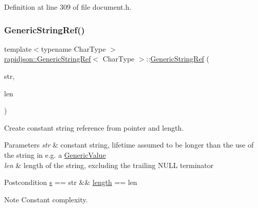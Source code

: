 Definition at line 309 of file document.\+h.


\begin{DoxyCode}{0}

\end{DoxyCode}
\mbox{\label{structrapidjson_1_1_generic_string_ref_ad9eb120a58cee500ff3bd5706779c4e4}} 
\subsubsection{\texorpdfstring{GenericStringRef()}{GenericStringRef()}\hspace{0.1cm}{\footnotesize\ttfamily [3/5]}}
{\footnotesize\ttfamily template$<$typename Char\+Type $>$ \\
\mbox{\hyperlink{structrapidjson_1_1_generic_string_ref}{rapidjson\+::\+Generic\+String\+Ref}}$<$ Char\+Type $>$\+::\mbox{\hyperlink{structrapidjson_1_1_generic_string_ref}{Generic\+String\+Ref}} (\begin{DoxyParamCaption}\item[{const Char\+Type $\ast$}]{str,  }\item[{\mbox{\hyperlink{namespacerapidjson_a44eb33eaa523e36d466b1ced64b85c84}{Size\+Type}}}]{len }\end{DoxyParamCaption})}



Create constant string reference from pointer and length. 


\begin{DoxyParams}{Parameters}
{\em str} & constant string, lifetime assumed to be longer than the use of the string in e.\+g. a \mbox{\hyperlink{classrapidjson_1_1_generic_value}{Generic\+Value}} \\
\hline
{\em len} & length of the string, excluding the trailing N\+U\+LL terminator\\
\hline
\end{DoxyParams}
\begin{DoxyPostcond}{Postcondition}
\mbox{\hyperlink{structrapidjson_1_1_generic_string_ref_a001276ee57cbcbd3c14449045c71e994}{s}} == str \&\& \mbox{\hyperlink{structrapidjson_1_1_generic_string_ref_ae223535ec20edf0c1db44a40b7735111}{length}} == len 
\end{DoxyPostcond}
\begin{DoxyNote}{Note}
Constant complexity. 
\end{DoxyNote}


